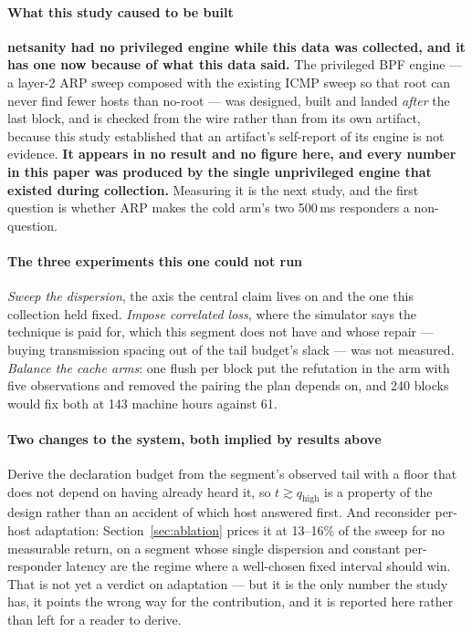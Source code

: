 \documentclass[conference]{IEEEtran}
\newcommand{\netsanity}{\textsf{netsanity}}
\newcommand{\qhigh}{q_{\mathrm{high}}}
\begin{document}
\paragraph*{What this study caused to be built}
\label{sec:engine}
\textbf{\netsanity{} had no privileged engine while this data was collected,
and it has one now because of what this data said.} The privileged BPF engine
--- a layer-2 ARP sweep composed with the existing ICMP sweep so that root can
never find fewer hosts than no-root --- was designed, built and landed
\emph{after} the last block, and is checked from the wire rather than from its
own artifact, because this study established that an artifact's self-report of
its engine is not evidence. \textbf{It appears in no result and no figure here,
and every number in this paper was produced by the single unprivileged engine
that existed during collection.} Measuring it is the next study, and the first
question is whether ARP makes the cold arm's two 500\,ms responders a
non-question.

\paragraph*{The three experiments this one could not run} \emph{Sweep the
dispersion}, the axis the central claim lives on and the one this collection
held fixed. \emph{Impose correlated loss}, where the simulator says the
technique is paid for, which this segment does not have and whose repair ---
buying transmission spacing out of the tail budget's slack --- was not
measured. \emph{Balance the cache arms}: one flush per block put the refutation
in the arm with five observations and removed the pairing the plan depends on,
and 240 blocks would fix both at 143 machine hours against 61.

\paragraph*{Two changes to the system, both implied by results above} Derive
the declaration budget from the segment's observed tail with a floor that does
not depend on having already heard it, so $t\gtrsim\qhigh$ is a property of the
design rather than an accident of which host answered first. And reconsider
per-host adaptation: Section~\ref{sec:ablation} prices it at 13--16\% of the
sweep for no measurable return, on a segment whose single dispersion and
constant per-responder latency are the regime where a well-chosen fixed
interval should win. That is not yet a verdict on adaptation --- but it is the
only number the study has, it points the wrong way for the contribution, and it
is reported here rather than left for a reader to derive.
\end{document}
